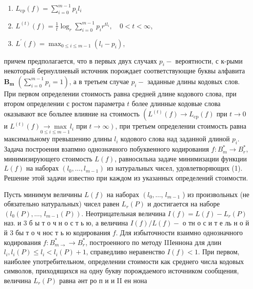 \documentclass[10pt]{article}
\begin{document}
\begin{enumerate}

  \item $L_{\mathrm{cp}}(f)=\sum_{i=0}^{m-1} p_{i} l_{i}$



  \item $L^{(t)}(f)=\frac{1}{t} \log _{r} \sum_{i=0}^{m-1} p_{i} r^{t l_{i}}, \quad 0<t<\infty$,



  \item $L^{\prime}(f)=\max _{0 \leqslant i \leqslant m-1}\left(l_{i}-p_{i}\right)$,



\end{enumerate}



причем предполагается, что в первых двух случаях $p_{i}-$ вероятности, с к-рыми некоторый бернуллиевый источник порождает соответствующие буквы алфавита $\boldsymbol{B}_{\boldsymbol{m}}$ $\left(\sum_{i=0}^{m-1} p_{i}=1\right)$, а в третьем случае $p_{i}-$ заданные длины кодовых слов. При первом определении стоимость равна средней длине кодового слова, при втором определении с ростом параметра $t$ более длинные кодовые слова оказывают все больпее влияние на стоимость $\left(L^{(t)}(f) \rightarrow L_{\mathrm{cp}}(f)\right.$ при $t \rightarrow 0$ и $L^{(t)}(f) \underset{0 \leqslant i \leqslant m-1}{\rightarrow \max } l_{i}$ при $\left.t \rightarrow \infty\right)$, при третьем определении стоимость равна максимальному превышению длины $l_{i}$ кодового слова над заданной длиной $p_{i}$. Задача построения взапмно однозначного побуквенного кодирования $f: B_{m}^{*} \rightarrow B_{r}^{*}$, минимизирующего стоимость $L(f)$, равносильна задаче минимизации функции $L(f)$ на наборах $\left(l_{0}, \ldots, l_{m-1}\right)$ из натуральных чисел, удовлетворяющих (1). Решение этой задачи известно при каждом из указанных определений стоимости.



Пусть минимум величины $L(f)$ на наборах $\left(l_{0}, \ldots\right.$, $l_{m-1}$ ) из произвольных (не обязательно натуральных) чисел равен $L_{r}(P)$ и достигается на наборе $\left(l_{0}(P), \ldots\right.$, $\left.l_{m-1}(P)\right)$. Неотрицательная величина $I(f)=L(f)-L_{r}(P)$ наз. и 3 б ы т о ч н о с т ь ю, а величина $I(f) / L(f)-$ о тн о с и т е ль н о й й 3 бы т о ч нос т ь ю кодирования $f$. Для избыточности взаимно однозначного кодирования $f: B_{m \rightarrow}^{*} \rightarrow B_{r}^{*}$, построенного по методу IIIеннона для длин $l_{i}, l_{i}(P) \leqslant l_{i}<l_{i}(P)+1$, справедливо неравенство $I(f)<1$. При первом, наиболее употребительном, определении стоимости как среднего числа кодовых символов, приходящихся на одну букву порождаемого источником сообщения, величина $L_{r}(P)$ равна әнт ро п и и II ен нона
\end{document}
